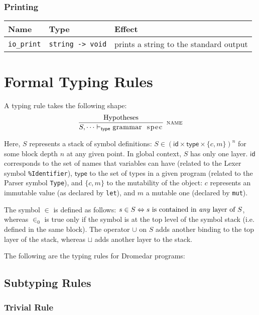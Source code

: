 \documentclass{article}
\newcommand{\code}[1]{\lstinline[columns=fixed]{#1}}
\newcommand{\drmrule}[5]{\frac{#1}{#2\vdash_{\mathsf{#3}}#4}\textsc{\ \small{#5}}}
\newcommand{\mc}[1]{\textnormal{\code{#1}}}
\begin{document}
			\subsubsection{Printing}
			
				\begin{longtable}{l|l|l}
					\textbf{Name} & \textbf{Type} & \textbf{Effect} \\
					\midrule
					\code{io_print} & \code{string -> void} & prints a string to the standard output
				\end{longtable}
		
	\section{Formal Typing Rules}
	
		A typing rule takes the following shape: $$ \drmrule{\mathrm{Hypotheses}}{S,\dots}{type}{\mc{grammar spec}}{name} $$
		
		Here, $S$ represents a stack of symbol definitions: $S \in (\mathsf{id} \times \mathsf{type} \times \{c,m\})^n$ for some block depth $n$ at any given point. In global context, $S$ has only one layer. $\mathsf{id}$ corresponds to the set of names that variables can have (related to the Lexer symbol \texttt{\%Identifier}), $\mathsf{type}$ to the set of types in a given program (related to the Parser symbol \texttt{Type}), and $\{c,m\}$ to the mutability of the object: $c$ represents an immutable value (as declared by \code{let}), and $m$ a mutable one (declared by \code{mut}).
		
		The symbol $\in$ is defined as follows: $s\in S \Leftrightarrow \textnormal{$s$ is contained in \textit{any} layer of $S$}$, whereas $\in_0$ is true only if the symbol is at the top level of the symbol stack (i.e. defined in the same block). The operator $\cup$ on $S$ adds another binding to the top layer of the stack, whereas $\sqcup$ adds another layer to the stack.
		
		The following are the typing rules for Dromedar programs:
		
		\subsection{Subtyping Rules}
		
			\subsubsection{Trivial Rule}
			
\end{document}
